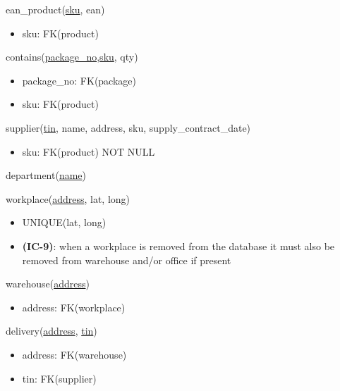 \documentclass[12pt,a4paper]{article}
\begin{document}
  \vspace*{10pt}
  \noindent
  ean\_product(\underline{sku}, ean)
  \begin{itemize}[nosep]
      \item sku: FK(product)
  \end{itemize}

  \vspace*{10pt}
  \noindent
  contains(\underline{package\_no},\underline{sku}, qty)
  \begin{itemize}[nosep]
      \item package\_no: FK(package)
      \item sku: FK(product)
  \end{itemize}

  \vspace*{10pt}
  \noindent
  supplier(\underline{tin}, name, address, sku, supply\_contract\_date)
  \begin{itemize}[nosep]
      \item sku: FK(product) NOT NULL
  \end{itemize}

  \vspace*{10pt}
  \noindent
  department(\underline{name})

  \vspace*{10pt}
  \noindent
  workplace(\underline{address}, lat, long)
  \begin{itemize}[nosep]
      \item UNIQUE(lat, long)
      \item \textsf{\textbf{(IC-9)}}: when a workplace \textsf{is removed} from the database it \textsf{must also} be removed from warehouse \textsf{and/or} office if present
  \end{itemize}

  \vspace*{10pt}
  \noindent
  warehouse(\underline{address})
  \begin{itemize}[nosep]
      \item address: FK(workplace)
  \end{itemize}

  \vspace*{10pt}
  \noindent
  delivery(\underline{address}, \underline{tin})
  \begin{itemize}[nosep]
      \item address: FK(warehouse)
      \item tin: FK(supplier)
  \end{itemize}
\end{document}
